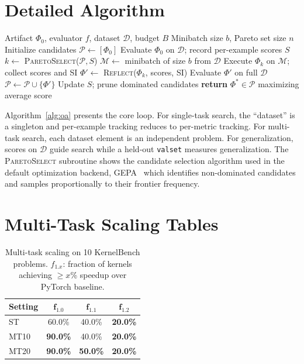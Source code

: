 \documentclass[sigconf]{acmart}
\newcommand{\oa}{\texttt{optimize\_anything}}
\newcommand{\asi}{SI}
\begin{document}
\section{Detailed Algorithm}\label{app:algorithm}

\begin{algorithm}[H]
\caption{\oa{}: Core optimization loop}
\label{alg:oa}
\begin{algorithmic}[1]
\small
\REQUIRE Artifact $\Phi_0$, evaluator $f$, dataset $\mathcal{D}$, budget $B$
\REQUIRE Minibatch size $b$, Pareto set size $n$
\STATE Initialize candidates $\mathcal{P} \gets [\Phi_0]$
\STATE Evaluate $\Phi_0$ on $\mathcal{D}$; record per-example scores $S$
  \STATE $k \gets$ \textsc{ParetoSelect}($\mathcal{P}, S$) 
  \STATE $\mathcal{M} \gets$ minibatch of size $b$ from $\mathcal{D}$
  \STATE Execute $\Phi_k$ on $\mathcal{M}$; collect scores and \asi{}
  \STATE $\Phi' \gets$ \textsc{Reflect}($\Phi_k$, scores, \asi{}) 
    \STATE Evaluate $\Phi'$ on full $\mathcal{D}$
    \STATE $\mathcal{P} \gets \mathcal{P} \cup \{\Phi'\}$
    \STATE Update $S$; prune dominated candidates
  \ENDIF
\ENDWHILE
\STATE \textbf{return} $\Phi^* \in \mathcal{P}$ maximizing average score
\end{algorithmic}
\end{algorithm}

Algorithm~\ref{alg:oa} presents the core loop. For single-task search, the ``dataset'' is a singleton and per-example tracking reduces to per-metric tracking. For multi-task search, each dataset element is an independent problem. For generalization, scores on $\mathcal{D}$ guide search while a held-out \texttt{valset} measures generalization. The \textsc{ParetoSelect} subroutine shows the candidate selection algorithm used in the default optimization backend, GEPA~\cite{agrawal2026gepa} which identifies non-dominated candidates and samples proportionally to their frontier frequency.

\section{Multi-Task Scaling Tables}\label{app:mt-scaling}

\begin{table}[h]
\caption{Multi-task scaling on 10 KernelBench problems. $f_{1.x}$: fraction of kernels achieving $\geq$$x$\% speedup over PyTorch baseline.}
\label{tab:mt-scaling}
\small
\begin{tabular}{@{}lccc@{}}
\toprule
\textbf{Setting} & $\mathbf{f_{1.0}}$ & $\mathbf{f_{1.1}}$ & $\mathbf{f_{1.2}}$ \\
\midrule
ST   & 60.0\% & 40.0\% & \textbf{20.0\%} \\
MT10 & \textbf{90.0\%} & 40.0\% & \textbf{20.0\%} \\
MT20 & \textbf{90.0\%} & \textbf{50.0\%} & \textbf{20.0\%} \\
\bottomrule
\end{tabular}
\end{table}
\end{document}
